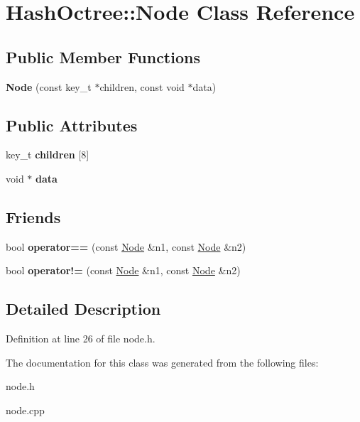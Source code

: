 \hypertarget{class_hash_octree_1_1_node}{}\section{Hash\+Octree\+::Node Class Reference}
\label{class_hash_octree_1_1_node}
\subsection*{Public Member Functions}
\begin{DoxyCompactItemize}
\item 
\mbox{\label{class_hash_octree_1_1_node_aad8b2499e8693406c6f5bbf34b582c4e}} 
{\bfseries Node} (const key\+\_\+t $\ast$children, const void $\ast$data)
\end{DoxyCompactItemize}
\subsection*{Public Attributes}
\begin{DoxyCompactItemize}
\item 
\mbox{\label{class_hash_octree_1_1_node_a5f588a6c54aa700b4e15d58fd76570a7}} 
key\+\_\+t {\bfseries children} \mbox{[}8\mbox{]}
\item 
\mbox{\label{class_hash_octree_1_1_node_ab55f1b98c6e3e1ff51324878e1aa4ff9}} 
void $\ast$ {\bfseries data}
\end{DoxyCompactItemize}
\subsection*{Friends}
\begin{DoxyCompactItemize}
\item 
\mbox{\label{class_hash_octree_1_1_node_a156456698e98563a77c4c0af13c20db1}} 
bool {\bfseries operator==} (const \mbox{\hyperlink{class_hash_octree_1_1_node}{Node}} \&n1, const \mbox{\hyperlink{class_hash_octree_1_1_node}{Node}} \&n2)
\item 
\mbox{\label{class_hash_octree_1_1_node_ab6e5d53f0f5779ea42a87e85a1f79277}} 
bool {\bfseries operator!=} (const \mbox{\hyperlink{class_hash_octree_1_1_node}{Node}} \&n1, const \mbox{\hyperlink{class_hash_octree_1_1_node}{Node}} \&n2)
\end{DoxyCompactItemize}


\subsection{Detailed Description}


Definition at line 26 of file node.\+h.



The documentation for this class was generated from the following files\+:\begin{DoxyCompactItemize}
\item 
node.\+h\item 
node.\+cpp\end{DoxyCompactItemize}
